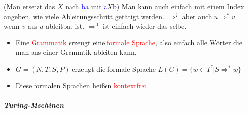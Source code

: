 \documentclass[12pt]{article}
\begin{document}
\begin{flushleft}
\begin{itemize}
        (Man ersetzt das $X$ nach \textcolor{blue}{ba} mit \textcolor{blue}{a}$X$\textcolor{blue}{b}) \linebreak
        \linebreak
        Man kann auch einfach mit einem Index angeben, wie viele Ableitungsschritt getätigt werden. \linebreak
        $\Rightarrow^2$ aber auch $u \Rightarrow^\ast v$ wenn $v$ aus $u$ ableitbar ist. $\Rightarrow^0$ ist einfach wieder das selbe.
        \begin{itemize}
            \item Eine \textcolor{red}{Grammatik} erzeugt eine \textcolor{red}{formale Sprache}, also einfach alle Wörter die man aus einer Grammtik ableiten kann.
            \item $G = (N,T,S,P)$ erzeugt die formale Sprache $L(G) = \{w \in T^* | S \Rightarrow^\ast w\}$
            \item Diese formalen Sprachen heißen \textcolor{red}{kontextfrei}
        \end{itemize}
    \end{itemize}
\end{flushleft}
\large\subparagraph{\large Turing-Mschinen}
\normalsize
\end{document}
